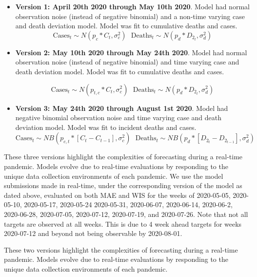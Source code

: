 \documentclass[11pt]{amsart}
\begin{document}
 \begin{itemize}
 
 \item \textbf{Version 1: April 20th 2020 through May 10th 2020}. Model had normal observation noise (instead of negative binomial) and a non-time varying case and death deviation model. Model was fit to cumulative deaths and cases. 
 \begin{equation}
\text{Cases}_{t} \sim N(p_{c}*C_{t} ,\sigma_{c}^2) \ \ \  
\text{Deaths}_{t} \sim N(p_d*D_{2_{t}} , \sigma_d^2)
\end{equation}

  \item \textbf{Version 2: May 10th 2020 through May 24th 2020}. Model had normal observation noise (instead of negative binomial) and time varying case and death deviation model. Model was fit to cumulative deaths and cases. 
  
   \begin{equation}
\text{Cases}_{t} \sim N(p_{t,c}*C_{t} ,\sigma_{c}^2) \ \ \  
\text{Deaths}_{t} \sim N(p_d*D_{2_{t}} , \sigma_d^2)
\end{equation}


    \item \textbf{Version 3: May 24th 2020 through August 1st 2020}. Model had negative binomial observation noise  and time varying case and death deviation model. Model was fit to incident deaths and cases. 
     \begin{equation}
\text{Cases}_{t} \sim NB(p_{c,t}*[C_{t}-C_{t-1}] ,\sigma_{c}^2) \ \ \  
\text{Deaths}_{t} \sim NB(p_d*[D_{2_{t}} - D_{2_{t-1}}] , \sigma_d^2)
\end{equation}
    
 \end{itemize} 
 
 
 These three versions highlight the complexities of forecasting during a real-time pandemic. Models evolve due to real-time evaluations by responding to the unique data collection environments of each pandemic. We use the model submissions made in real-time, under the corresponding version of the model as dated above, evaluated on both MAE and WIS for the weeks of 2020-05-05, 2020-05-10, 2020-05-17, 2020-05-24 2020-05-31, 2020-06-07, 2020-06-14, 2020-06-2, 2020-06-28, 2020-07-05, 2020-07-12, 2020-07-19, and 2020-07-26. Note that not all targets are observed at all weeks. This is due to 4 week ahead targets for weeks 2020-07-12 and beyond not being observable by 2020-08-01.
  
 
 These two versions highlight the complexities of forecasting during a real-time pandemic. Models evolve due to real-time evaluations by responding to the unique data collection environments of each pandemic.
\end{document}
